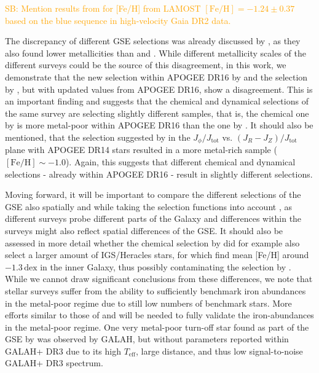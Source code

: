 \documentclass[fleqn,usenatbib]{mnras}
\newcommand{\SB}[1]{{\textcolor{orange}{SB: #1}}}
\newcommand{\dex}{\,\mathrm{dex}}	%
\begin{document}
\SB{Mention results from \citet{Amarante2020b} for [Fe/H] from LAMOST $\mathrm{[Fe/H]} = -1.24 \pm 0.37$ based on the blue sequence in high-velocity Gaia DR2 data.}

The discrepancy of different GSE selections was already discussed by \citet{Bonifacio2021}, as they also found lower metallicities than \citet{Naidu2020} and \citet{Feuillet2020}. While different metallicity scales of the different surveys could be the source of this disagreement, in this work, we demonstrate that the new selection within APOGEE DR16 by \citet{Feuillet2021} and the selection by \citet{Das2020}, but with updated values from APOGEE DR16, show a disagreement. This is an important finding and suggests that the chemical and dynamical selections of the same survey are selecting slightly different samples, that is, the chemical one by \citet{Das2020} is more metal-poor within APOGEE DR16 than the one by \citet{Feuillet2021}. It should also be mentioned, that the selection suggested by \citet{Myeong2019} in the $J_\phi/J_\text{tot}$ vs. $\left(J_R - J_Z\right)/J_\text{tot}$ plane with APOGEE DR14 stars resulted in a more metal-rich sample ($\mathrm{[Fe/H]} \sim -1.0$). Again, this suggests that different chemical and dynamical selections - already within APOGEE DR16 - result in slightly different selections.

Moving forward, it will be important to compare the different selections of the GSE also spatially and while taking the selection functions into account \citep[e.g.][]{Lane2021}, as different surveys probe different parts of the Galaxy and differences within the surveys might also reflect spatial differences of the GSE. It should also be assessed in more detail whether the chemical selection by \citet{Das2020} did for example also select a larger amount of IGS/Heracles stars, for which \citet{Horta2021} find mean [Fe/H] around $-1.3\dex$ in the inner Galaxy, thus possibly contaminating the selection by \citet{Das2020}. While we cannot draw significant conclusions from these differences, we note that stellar surveys suffer from the ability to sufficiently benchmark iron abundances in the metal-poor regime due to still low numbers of benchmark stars. More efforts similar to those of \citet{Hawkins2016} and \citet{Karovicova2020} will be needed to fully validate the iron-abundances in the metal-poor regime. One very metal-poor turn-off star found as part of the GSE by \citet{Naidu2020} was observed by GALAH, but without parameters reported within GALAH+ DR3 due to its high $T_\text{eff}$, large distance, and thus low signal-to-noise GALAH+ DR3 spectrum.
\end{document}
